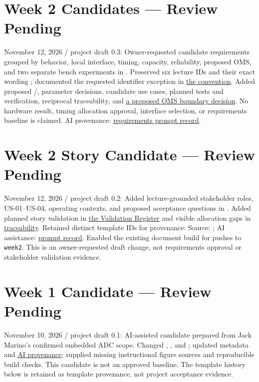 \section{Week 2 Candidates --- Review Pending}
November 12, 2026 / project draft 0.3: Owner-requested candidate requirements
grouped by behavior, local interface, timing, capacity, reliability, proposed
OMS, and two separate bench experiments in .
Preserved six lecture IDs and their exact wording
\cite[slides 27, 30, 32, 34, 36]{SPE800Week02}; documented the requested
identifier exception in \hyperref[Section:LectureRequirementIDs]{the convention}.
Added proposed /, parameter decisions,
candidate use cases, planned tests and verification, reciprocal traceability,
and \hyperref[Section:ProposedOMSBoundary]{a proposed OMS boundary decision}.
No hardware result, timing allocation approval, interface selection, or
requirements baseline is claimed. AI provenance:
\hyperref[Section:WeekTwoRequirementsPrompt]{requirements prompt record}.

\section{Week 2 Story Candidate --- Review Pending}
November 12, 2026 / project draft 0.2: Added lecture-grounded stakeholder
roles, US-01--US-04, operating contexts, and proposed acceptance questions in
. Added planned story validation in
\hyperref[Table:ValidationRegister]{the Validation Register} and visible
allocation gaps in \hyperref[Table:TraceabilityMatrix]{traceability}.
Retained distinct template IDs for provenance. Source:
\cite[slides 19--20]{SPE800Week02}; AI assistance:
\hyperref[Section:WeekTwoStoryPromptRecord]{prompt record}.
Enabled the existing document build for pushes to \texttt{week2}.
This is an owner-requested draft change, not requirements approval or
stakeholder validation evidence.

\section{Week 1 Candidate --- Review Pending}
November 10, 2026 / project draft 0.1: AI-assisted candidate prepared from
Jack Marino's confirmed embedded ADC scope. Changed
, , and
; updated metadata and
\hyperref[Section:WeekOnePromptRecord]{AI provenance}; supplied missing
instructional figure sources and reproducible build checks. This candidate
is not an approved baseline. The template history below is retained as
template provenance, not project acceptance evidence.

